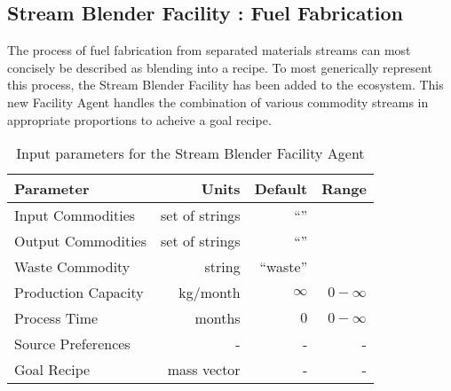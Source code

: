 \subsection{Stream Blender Facility : Fuel Fabrication}

The process of fuel fabrication from separated materials streams can most
concisely be described as blending into a recipe. To most generically represent
this process, the Stream Blender Facility has been added to the \Cyclus 
ecosystem.  This new Facility Agent handles the combination of various 
commodity streams in appropriate proportions to acheive a goal recipe.  

\begin{table}[h!]
\centering
\begin{tabular}{|l|r|r|r|}
\hline
\textbf{Parameter} & \textbf{Units} & \textbf{Default} & \textbf{Range}\\
\hline
Input Commodities & set of strings& ``''& \\
Output Commodities & set of strings&``'' & \\
Waste Commodity & string & ``waste'' & \\
Production Capacity& kg/month& $\infty$& $0-\infty$\\
Process Time& months & $0$ & $0-\infty$ \\
Source Preferences& - & - & - \\
Goal Recipe& mass vector & - & -  \\
\hline
\end{tabular}
\caption{Input parameters for the Stream Blender Facility Agent}
\label{tab:commodconverter}
\end{table}
